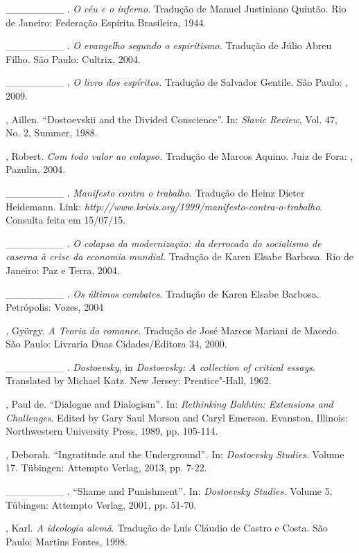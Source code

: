 \begin{Parskip}
\_\_\_\_\_\_\_\_ . \emph{O céu e o inferno.} Tradução de Manuel
Justiniano Quintão. Rio de Janeiro: Federação Espírita Brasileira, 1944.

\_\_\_\_\_\_\_\_ . \emph{O evangelho segundo o espiritismo.} Tradução de
Júlio Abreu Filho. São Paulo: Cultrix, 2004.

\_\_\_\_\_\_\_\_ . \emph{O livro dos espíritos.} Tradução de Salvador
Gentile. São Paulo: , 2009.

, Aillen. ``Dostoevskii and the Divided Conscience''. In:
\emph{Slavic Review,} Vol. 47, No. 2, Summer, 1988.

, Robert. \emph{Com todo valor ao colapso.} Tradução de Marcos
Aquino. Juiz de Fora: , Pazulin, 2004.

\_\_\_\_\_\_\_\_ . \emph{Manifesto contra o trabalho}. Tradução de Heinz
Dieter Heidemann. Link:
\emph{http://www.krisis.org/1999/manifesto-contra-o-trabalho}.
Consulta feita em 15/07/15.

\_\_\_\_\_\_\_\_ . \emph{O colapso da modernização: da derrocada do
socialismo de caserna à crise da economia mundial.} Tradução de Karen
Elsabe Barbosa. Rio de Janeiro: Paz e Terra, 2004.

\_\_\_\_\_\_\_\_ . \emph{Os últimos combates.} Tradução de Karen Elsabe
Barbosa. Petrópolis: Vozes, 2004

\emph{,} György. \emph{A Teoria do romance}. Tradução de José
Marcos Mariani de Macedo. São Paulo: Livraria Duas Cidades/Editora 34,
2000.

\_\_\_\_\_\_\_\_ . \emph{Dostoevsky}, in \emph{Dostoevsky: A collection
of critical essays}. Translated by Michael Katz. New Jersey:
Prentice"-Hall, 1962.

, Paul de. ``Dialogue and Dialogism''\emph{.} In: \emph{Rethinking
Bakhtin: Extensions and Challenges}. Edited by Gary Saul Morson and
Caryl Emerson. Evanston, Illinois: Northwestern University Press, 1989,
pp. 105-114.

, Deborah. ``Ingratitude and the Underground''\emph{.} In:
\emph{Dostoevsky Studies.} Volume 17. Tübingen: Attempto Verlag, 2013,
pp. 7-22.

\_\_\_\_\_\_\_\_ . ``Shame and Punishment''\emph{.} In: \emph{Dostoevsky
Studies.} Volume 5. Tübingen: Attempto Verlag, 2001, pp. 51-70.

, Karl. \emph{A ideologia alemã}. Tradução de Luís Cláudio de Castro
e Costa. São Paulo: Martins Fontes, 1998.


\end{Parskip}
